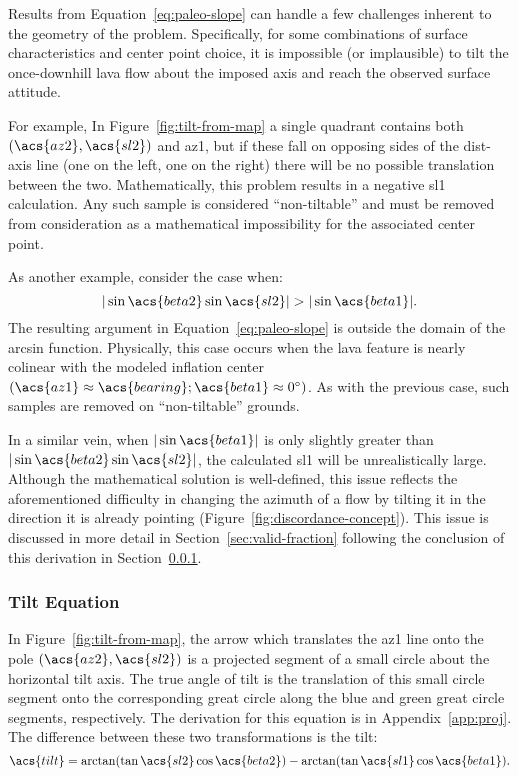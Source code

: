 Results from Equation~\eqref{eq:paleo-slope} can handle a few challenges inherent to the geometry of the problem. Specifically, for some combinations of surface characteristics and center point choice, it is impossible (or implausible) to tilt the once-downhill lava flow about the imposed axis and reach the observed surface attitude. 

For example, In Figure~\ref{fig:tilt-from-map} a single quadrant contains both $\left(\acs{az2},\acs{sl2}\right)$ and \acs{az1}, but if these fall on opposing sides of the \acs{dist}-axis line (one on the left, one on the right) there will be no possible translation between the two. Mathematically, this problem results in a negative \acf{sl1} calculation. Any such sample is considered ``non-tiltable'' and must be removed from consideration as a mathematical impossibility for the associated center point.

As another example, consider the case when:
\begin{equation}
     |\sin\acs{beta2}\sin\acs{sl2}| > |\sin\acs{beta1}|.\label{eq:domain-error}
\end{equation}
The resulting argument in Equation~\eqref{eq:paleo-slope} is outside the domain of the arcsin function. Physically, this case occurs when the lava feature is nearly colinear with the modeled inflation center $(\acs{az1}\approx\acs{bearing}; \acs{beta1}\approx\ang{0})$. As with the previous case, such samples are removed on ``non-tiltable'' grounds.

In a similar vein, when $|\sin\acs{beta1}|$ is only slightly greater than $|\sin\acs{beta2}\sin\acs{sl2}|$, the calculated \acs{sl1} will be unrealistically large. Although the mathematical solution is well-defined, this issue reflects the aforementioned difficulty in changing the azimuth of a flow by tilting it in the direction it is already pointing (Figure~\ref{fig:discordance-concept}). This issue is discussed in more detail in Section~\ref{sec:valid-fraction} following the conclusion of this derivation in Section~\ref{sec:map-tilt-equation}.

\subsubsection{Tilt Equation}\label{sec:map-tilt-equation}

In Figure~\ref{fig:tilt-from-map}, the arrow which translates the \acs{az1} line onto the pole $\left(\acs{az2},\acs{sl2}\right)$ is a projected segment of a small circle about the horizontal tilt axis. The true angle of tilt is the translation of this small circle segment onto the corresponding great circle along the blue and green great circle segments, respectively. The derivation for this equation is in Appendix~\ref{app:proj}. The difference between these two transformations is the tilt:
\begin{equation}
    \acs{tilt} = \arctan(\tan\acs{sl2}\cos\acs{beta2}) - \arctan(\tan\acs{sl1}\cos\acs{beta1}).\label{eq:tilt-from-map}
\end{equation}

